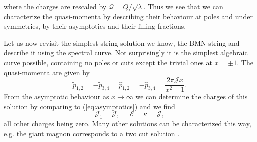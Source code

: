 where the charges are rescaled by $\mathcal{Q} = Q / \sqrt{\lambda}$. Thus we see that we can characterize the quasi-momenta by describing their behaviour at poles and under symmetries, by their asymptotics and their filling fractions. 

Let us now revisit the simplest string solution we know, the BMN string and describe it using the spectral curve. Not surprisingly it is the simplest algebraic curve possible, containing no poles or cuts except the trivial ones at $x = \pm 1$. The quasi-momenta are given by \cite{bmn_from_curve}
\begin{equation}
	\tilde{p}_{1,2} = -\tilde{p}_{3,4} = \hat{p}_{1,2} = -\hat{p}_{3,4} = \frac{2 \pi \mathcal{J} x}{x^2 - 1}.
\end{equation}
From the asymptotic behaviour as $x \rightarrow \infty$ we can determine the charges of this solution by comparing to (\ref{eq:asymptotics}) and we find
\begin{equation}
	\mathcal{J}_1 = \mathcal{J}, \;\;\;\;\; \mathcal{E} = \kappa = \mathcal{J},
\end{equation}
all other charges being zero. Many other solutions can be characterized this way, e.g. the giant magnon corresponds to a two cut solution \cite{gromov_quasiclassical}.

